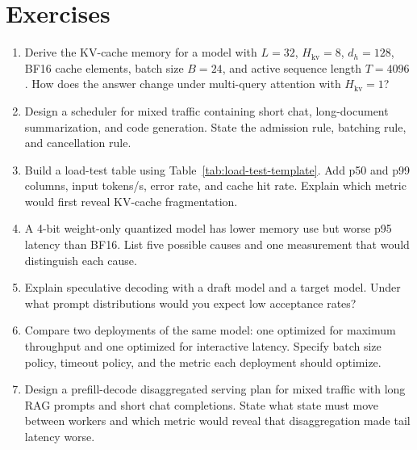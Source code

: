 \section{Exercises}
\label{sec:serving-exercises}

\begin{enumerate}
\item Derive the KV-cache memory for a model with $L=32$, $H_{\mathrm{kv}}=8$, $d_h=128$, BF16 cache elements, batch size $B=24$, and active sequence length $T=4096$. How does the answer change under multi-query attention with $H_{\mathrm{kv}}=1$?
\item Design a scheduler for mixed traffic containing short chat, long-document summarization, and code generation. State the admission rule, batching rule, and cancellation rule.
\item Build a load-test table using Table~\ref{tab:load-test-template}. Add p50 and p99 columns, input tokens/s, error rate, and cache hit rate. Explain which metric would first reveal KV-cache fragmentation.
\item A 4-bit weight-only quantized model has lower memory use but worse p95 latency than BF16. List five possible causes and one measurement that would distinguish each cause.
\item Explain speculative decoding with a draft model and a target model. Under what prompt distributions would you expect low acceptance rates?
\item Compare two deployments of the same model: one optimized for maximum throughput and one optimized for interactive latency. Specify batch size policy, timeout policy, and the metric each deployment should optimize.
\item Design a prefill-decode disaggregated serving plan for mixed traffic with long RAG prompts and short chat completions. State what state must move between workers and which metric would reveal that disaggregation made tail latency worse.
\end{enumerate}
